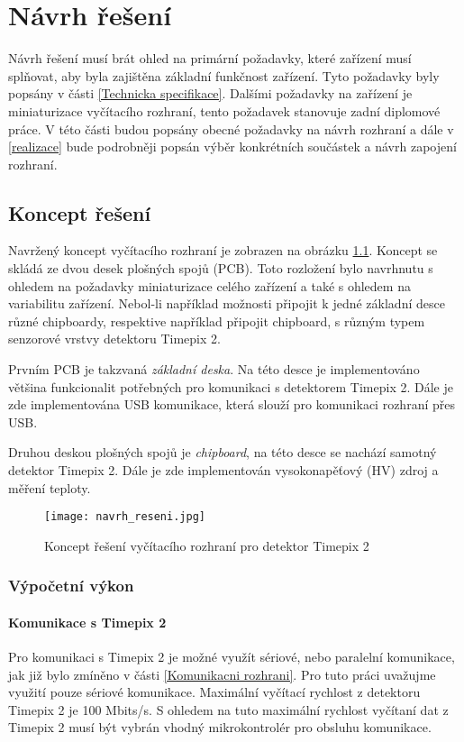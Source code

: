 \chapter{Návrh řešení} %
Návrh řešení musí brát ohled na primární požadavky, které zařízení musí splňovat, aby byla zajištěna základní funkčnost zařízení. Tyto požadavky byly popsány v části \ref{Technicka specifikace}. Dalšími požadavky na zařízení je miniaturizace vyčítacího rozhraní, tento požadavek stanovuje zadní diplomové práce. V této části budou popsány obecné požadavky na návrh rozhraní a dále v \ref{realizace} bude podrobněji popsán výběr konkrétních součástek a návrh zapojení rozhraní.

\section{Koncept řešení}
Navržený koncept vyčítacího rozhraní je zobrazen na obrázku \ref{fig:navrh_reseni}. Koncept se skládá ze dvou desek plošných spojů (PCB). Toto rozložení bylo navrhnutu s ohledem na požadavky miniaturizace celého zařízení a také s ohledem na variabilitu zařízení. Nebol-li například možnosti připojit k jedné základní desce různé chipboardy, respektive například připojit chipboard, s různým typem senzorové vrstvy detektoru Timepix 2. 
\par Prvním PCB je takzvaná \textit{základní deska}. Na této desce je implementováno většina funkcionalit potřebných pro komunikaci s detektorem Timepix 2. Dále je zde implementována USB komunikace, která slouží pro komunikaci rozhraní přes USB.
\par Druhou deskou plošných spojů je \textit{chipboard}, na této desce se nachází samotný detektor Timepix 2. Dále je zde implementován vysokonapěťový (HV) zdroj a měření teploty.
 
\begin{figure}[h!]
	\centering
	\captionsetup{justification=centering}
	\texttt{[image: navrh\_reseni.jpg]}
	\caption{Koncept řešení vyčítacího rozhraní pro detektor Timepix 2} 
	\label{fig:navrh_reseni}
\end{figure}

\subsection{Výpočetní výkon}
\subsubsection{Komunikace s Timepix 2}
Pro komunikaci s Timepix 2 je možné využít sériové, nebo paralelní komunikace, jak již bylo zmíněno v části \ref{Komunikacni rozhrani}. Pro tuto práci uvažujme využití pouze sériové komunikace. Maximální vyčítací rychlost z detektoru Timepix 2 je 100 Mbits/s. S ohledem na tuto maximální rychlost vyčítaní dat z Timepix 2 musí být vybrán vhodný mikrokontrolér pro obsluhu komunikace. 

